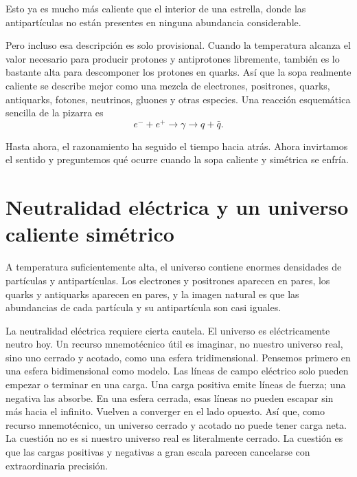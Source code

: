 Esto ya es mucho más caliente que el interior de una estrella, donde las antipartículas no están presentes en ninguna abundancia considerable.

Pero incluso esa descripción es solo provisional. Cuando la temperatura alcanza el valor necesario para producir protones y antiprotones libremente, también es lo bastante alta para descomponer los protones en quarks. Así que la sopa realmente caliente se describe mejor como una mezcla de electrones, positrones, quarks, antiquarks, fotones, neutrinos, gluones y otras especies. Una reacción esquemática sencilla de la pizarra es
\[
e^- + e^+ \to \gamma \to q + \bar q.
\]

\begin{classroomqa}
\end{classroomqa}

Hasta ahora, el razonamiento ha seguido el tiempo hacia atrás. Ahora invirtamos el sentido y preguntemos qué ocurre cuando la sopa caliente y simétrica se enfría.

\section{Neutralidad eléctrica y un universo caliente simétrico}

A temperatura suficientemente alta, el universo contiene enormes densidades de partículas y antipartículas. Los electrones y positrones aparecen en pares, los quarks y antiquarks aparecen en pares, y la imagen natural es que las abundancias de cada partícula y su antipartícula son casi iguales.

La neutralidad eléctrica requiere cierta cautela. El universo es eléctricamente neutro hoy. Un recurso mnemotécnico útil es imaginar, no nuestro universo real, sino uno cerrado y acotado, como una esfera tridimensional. Pensemos primero en una esfera bidimensional como modelo. Las líneas de campo eléctrico solo pueden empezar o terminar en una carga. Una carga positiva emite líneas de fuerza; una negativa las absorbe. En una esfera cerrada, esas líneas no pueden escapar sin más hacia el infinito. Vuelven a converger en el lado opuesto. Así que, como recurso mnemotécnico, un universo cerrado y acotado no puede tener carga neta. La cuestión no es si nuestro universo real es literalmente cerrado. La cuestión es que las cargas positivas y negativas a gran escala parecen cancelarse con extraordinaria precisión.

